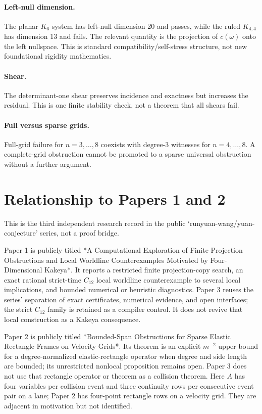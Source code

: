 \documentclass[11pt]{article}
\theoremstyle{definition}
\theoremstyle{remark}
\begin{document}
\paragraph{Left-null dimension.} The planar $K_6$ system has left-null dimension 20 and passes, while the ruled $K_{4,4}$ has dimension 13 and fails. The relevant quantity is the projection of $c(\omega)$ onto the left nullspace. This is standard compatibility/self-stress structure, not new foundational rigidity mathematics.

\paragraph{Shear.} The determinant-one shear preserves incidence and exactness but increases the residual. This is one finite stability check, not a theorem that all shears fail.

\paragraph{Full versus sparse grids.} Full-grid failure for $n=3,\ldots,8$ coexists with degree-3 witnesses for $n=4,\ldots,8$. A complete-grid obstruction cannot be promoted to a sparse universal obstruction without a further argument.

\section{Relationship to Papers 1 and 2}

This is the third independent research record in the public `runyuan-wang/yuan-conjecture' series, not a proof bridge.

Paper 1 is publicly titled *A Computational Exploration of Finite Projection Obstructions and Local Worldline Counterexamples Motivated by Four-Dimensional Kakeya*. It reports a restricted finite projection-copy search, an exact rational strict-time $C_{12}$ local worldline counterexample to several local implications, and bounded numerical or heuristic diagnostics. Paper 3 reuses the series' separation of exact certificates, numerical evidence, and open interfaces; the strict $C_{12}$ family is retained as a compiler control. It does not revive that local construction as a Kakeya consequence.

Paper 2 is publicly titled *Bounded-Span Obstructions for Sparse Elastic Rectangle Frames on Velocity Grids*. Its theorem is an explicit $m^{-2}$ upper bound for a degree-normalized elastic-rectangle operator when degree and side length are bounded; its unrestricted nonlocal proposition remains open. Paper 3 does not use that rectangle operator or theorem as a collision theorem. Here $A$ has four variables per collision event and three continuity rows per consecutive event pair on a lane; Paper 2 has four-point rectangle rows on a velocity grid. They are adjacent in motivation but not identified.
\end{document}
